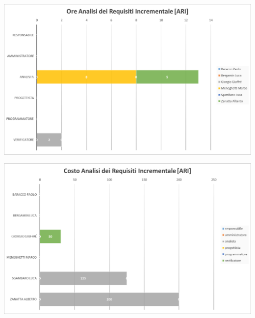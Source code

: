 	{\includegraphics[width=15cm]{img/oreari2.png}\par}

	{\includegraphics[width=15cm]{img/costoari.png}\par}


\subsection{\PA}

